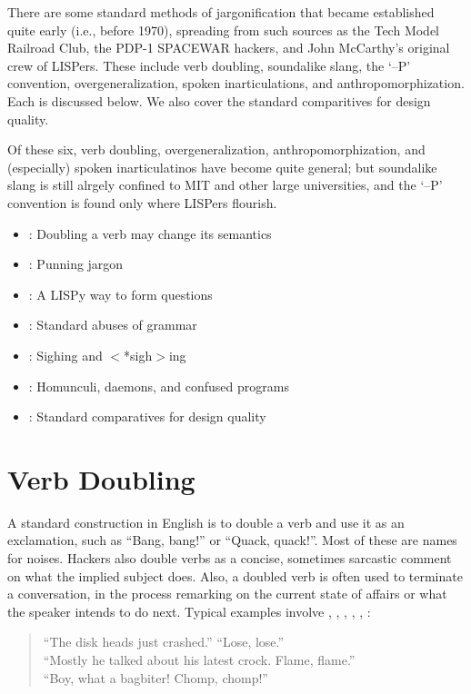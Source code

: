 There are some standard methods of jargonification that became established quite early (i.e., before 1970), spreading from such sources as
the Tech Model Railroad Club, the PDP-1 SPACEWAR hackers, and John McCarthy's original crew of LISPers. These include verb doubling,
soundalike slang, the `--P' convention, overgeneralization, spoken inarticulations, and anthropomorphization. Each is discussed below. We
also cover the standard comparitives for design quality.

Of these six, verb doubling, overgeneralization, anthropomorphization, and (especially) spoken inarticulatinos have become quite general;
but soundalike slang is still alrgely confined to MIT and other large universities, and the `--P' convention is found only where LISPers
flourish.

\begin{itemize}
	\item{}: Doubling a verb may change its semantics
	\item{}: Punning jargon
	\item{}: A LISPy way to form questions
	\item{}: Standard abuses of grammar
	\item{}: Sighing and $<$*sigh$>$ing
	\item{}: Homunculi, daemons, and confused programs
	\item{}: Standard comparatives for design quality
\end{itemize}


\section*{Verb Doubling}\label{Verb-Doubling}
	A standard construction in English is to double a verb and use it as an exclamation, such as ``Bang, bang!'' or ``Quack, quack!''. Most
	of these are names for noises. Hackers also double verbs as a concise, sometimes sarcastic comment on what the implied subject does.
	Also, a doubled verb is often used to terminate a conversation, in the process remarking on the current state of affairs or what the
	speaker intends to do next. Typical examples involve , , , ,
	, :

	\begin{quote}
		``The disk heads just crashed.'' ``Lose, lose.''\\
		``Mostly he talked about his latest crock. Flame, flame.''\\
		``Boy, what a bagbiter! Chomp, chomp!''
	\end{quote}

